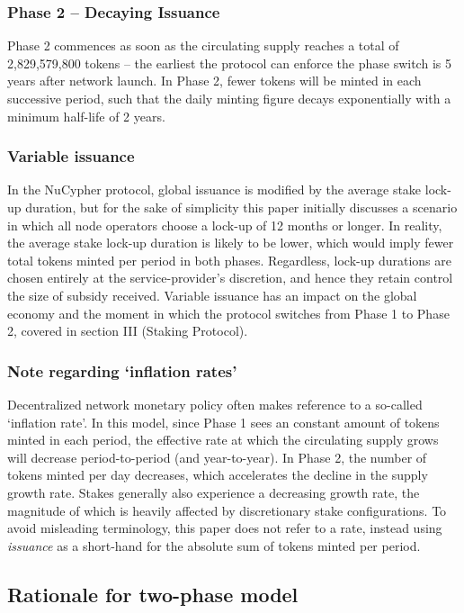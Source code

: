 \documentclass[longbibliography,nofootinbib]{revtex4-1}
\begin{document}
\subsubsection{Phase 2 – Decaying Issuance}
Phase 2 commences as soon as the circulating supply reaches a total of 2,829,579,800 tokens – the earliest the protocol can enforce the phase switch is 5 years after network launch. In Phase 2, fewer tokens will be minted in each successive period, such that the daily minting figure decays exponentially with a minimum half-life of 2 years. 

\subsubsection{Variable issuance}
In the NuCypher protocol, global issuance is modified by the average stake lock-up duration, but for the sake of simplicity this paper initially discusses a scenario in which all node operators choose a lock-up of 12 months or longer. In reality, the average stake lock-up duration is likely to be lower, which would imply fewer total tokens minted per period in both phases. Regardless, lock-up durations are chosen entirely at the service-provider's discretion, and hence they retain control the size of subsidy received. Variable issuance has an impact on the global economy and the moment in which the protocol switches from Phase 1 to Phase 2, covered in section III (Staking Protocol). 

\subsubsection{Note regarding `inflation rates'}

Decentralized network monetary policy often makes reference to a so-called `inflation rate'. In this model, since Phase 1 sees an constant amount of tokens minted in each period, the effective rate at which the circulating supply grows will decrease period-to-period (and year-to-year). In Phase 2, the number of tokens minted per day decreases, which accelerates the decline in the supply growth rate. Stakes generally also experience a decreasing growth rate, the magnitude of which is heavily affected by discretionary stake configurations. To avoid misleading terminology, this paper does not refer to a rate, instead using \textit{issuance} as a short-hand for the absolute sum of tokens minted per period.

\subsection{Rationale for two-phase model}
\end{document}
